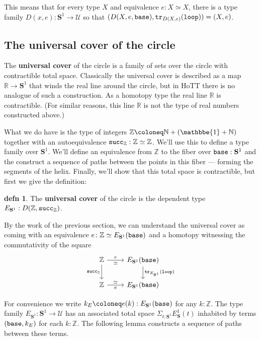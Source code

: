 \documentclass{amsart}
\theoremstyle{theorem}
\theoremstyle{definition}
\newtheorem*{defn}{defn}
\theoremstyle{remark}
\newcommand{\0}{\mathbbe{0}}
\newcommand{\1}{\mathbbe{1}}
\newcommand{\2}{\mathbbe{2}}
\newcommand{\3}{\mathbbe{3}}
\newcommand{\4}{\mathbbe{4}}
\newcommand{\NN}{\mathbb{N}}
\newcommand{\RR}{\mathbb{R}}
\newcommand{\ZZ}{\mathbb{Z}}
\newcommand{\term}[1]{{\textup{\texttt{#1}}}}
\newcommand{\tr}{\term{tr}}
\newcommand{\UU}{{\mathcal{U}}}
\newcommand{\Sone}{\mathbf{S}^1}
\newcommand{\base}{\term{base}}
\newcommand{\lloop}{\term{loop}}
\begin{document}
  This means that for every type $X$ and equivalence $e : X \simeq X$, there is a type family $D(x,e) : \Sone \to \UU$ so that $(D(X,e,\base), \tr_{D(X,e)}(\lloop)) = (X,e)$.

\subsection*{The universal cover of the circle}

The \textbf{universal cover} of the circle is a family of sets over the circle with contractible total space. Classically the universal cover is described as a map $\RR \to \Sone$ that winds the real line around the circle, but in HoTT there is no analogue of such a construction. As a homotopy type the real line $\RR$ is contractible. (For similar reasons, this line $\RR$ is not the type of real numbers constructed above.)

What we do have is the type of integers $\ZZ \coloneq \NN + (\1 + \NN)$ together with an autoequivalence $\term{succ}_\ZZ : \ZZ \simeq \ZZ$. We'll use this to define a type family over $\Sone$. We'll define an equivalence from $\ZZ$ to the fiber over $\base : \Sone$ and the construct a sequence of paths between the points in this fiber --- forming the segments of the helix. Finally, we'll show that this total space is contractible, but first we give the definition:

\begin{defn} The \textbf{universal cover} of the circle is the dependent type $E_{\Sone} : D(\ZZ, \term{succ}_\ZZ)$. 
\end{defn}

By the work of the previous section, we can understand the universal cover as coming with an equivalence $e \colon \ZZ \simeq E_{\Sone}(\base)$ and a homotopy witnessing the commutativity of the square
\[ 
\begin{tikzcd}
\ZZ \arrow[d, "\term{succ}_\ZZ"']  \arrow[r, "e", "\simeq"'] & E_{\Sone}(\base) \arrow[d, "\tr_{E_{\Sone}}(\lloop)"] \\ \ZZ \arrow[r, "e"', "\simeq"] & E_{\Sone}(\base)
\end{tikzcd}
\]

For convenience we write $k_E \coloneq e(k) : E_{\Sone}(\base)$ for any $k : \ZZ$. The type family $E_{\Sone} : \Sone \to \UU$ has an associated total space $\Sigma_{t: \Sone} E_\Sone(t)$ inhabited by terms $(\base, k_E)$ for each $k : \ZZ$. The following lemma constructs a sequence of paths between these terms.
\end{document}
